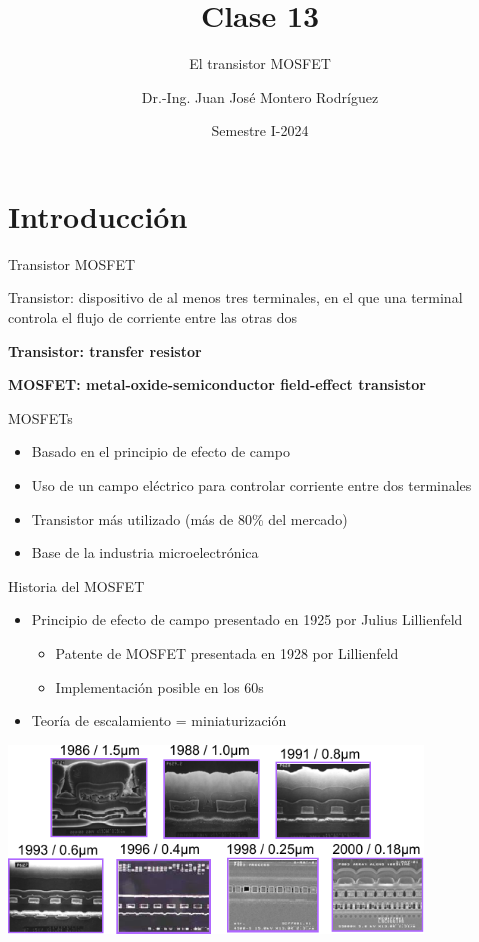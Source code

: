 \documentclass[t,aspectratio=169,10pt]{beamer}
\title{Clase 13}
\subtitle{El transistor MOSFET}
\author{Dr.-Ing. Juan José Montero Rodríguez}
\institute{Escuela de Ingeniería Electrónica}
\date{Semestre I-2024}
\begin{document}
\begin{frame}
\titlepage
\end{frame}


\section{Introducción}
\begin{frame}{Transistor MOSFET}

Transistor: dispositivo de al menos tres terminales, en el que una terminal controla el flujo de corriente entre las otras dos


\centering
\vspace{5mm}
\textbf{Transistor: transfer resistor}

\vspace{5mm}
\textbf{MOSFET: metal-oxide-semiconductor field-effect transistor}

\raggedright
\vspace{5mm}
MOSFETs

\begin{itemize}
\item Basado en el principio de efecto de campo
\item Uso de un campo eléctrico para controlar corriente entre dos terminales
\item Transistor más utilizado (más de 80\% del mercado)
\item Base de la industria microelectrónica
\end{itemize}
\end{frame}


\begin{frame}{Historia del MOSFET}

\begin{itemize}
	\item Principio de efecto de campo presentado en 1925 por Julius Lillienfeld
	\begin{itemize}
		\item Patente de MOSFET presentada en 1928 por Lillienfeld
		\item Implementación posible en los 60s
	\end{itemize}
	\item Teoría de escalamiento = miniaturización
\end{itemize}

\vspace{3mm}\centering
\includegraphics[width=11cm]{crosssections}
\end{frame}
\end{document}

